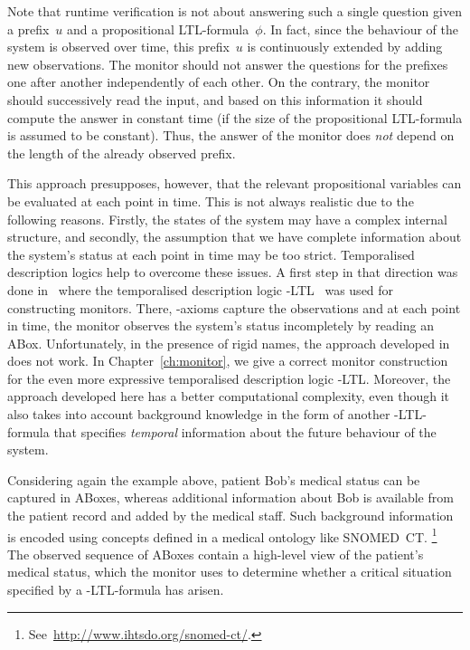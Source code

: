 Note that runtime verification is not about answering such a single question
given a prefix~$u$ and a propositional LTL-formula~$\phi$.  In fact, since the
behaviour of the system is observed over time, this prefix~$u$ is continuously
extended by adding new observations.  The monitor should not answer the
questions for the prefixes one after another independently of each other.  On
the contrary, the monitor should successively read the input, and based on this
information it should compute the answer in constant time (if the size of the
propositional LTL-formula is assumed to be constant).  Thus, the answer of the
monitor does \emph{not} depend on the length of the already observed prefix.

This approach presupposes, however, that the relevant propositional variables
can be evaluated at each point in time.  This is not always realistic due to the
following reasons.  Firstly, the states of the system may have a complex
internal structure, and secondly, the assumption that we have complete
information about the system's status at each point in time may be too strict.
%
Temporalised description logics help to overcome these issues.  A first step in
that direction was done in~\cite{BaBL-FroCoS09} where the temporalised
description logic \ALC-LTL~\cite{BaGL-ToCL12} was used for constructing
monitors.  There, \ALC-axioms capture the observations and at each point in
time, the monitor observes the system's status incompletely by reading an ABox.
Unfortunately, in the presence of rigid names, the approach developed
in~\cite{BaBL-FroCoS09} does not work.  In Chapter~\ref{ch:monitor}, we give a
correct monitor construction for the even more expressive temporalised
description logic \SHOQ-LTL\@.  Moreover, the approach developed here has a
better computational complexity, even though it also takes into account
background knowledge in the form of another \SHOQ-LTL-formula that specifies
\emph{temporal} information about the future behaviour of the system.

Considering again the example above, patient Bob's medical status can be
captured in ABoxes, whereas additional information about Bob is available from
the patient record and added by the medical staff.  Such background information
is encoded using concepts defined in a medical ontology like SNOMED~CT.%
\footnote{See~\url{http://www.ihtsdo.org/snomed-ct/}.}
The observed sequence of ABoxes contain a high-level view of the patient's
medical status, which the monitor uses to determine whether a critical situation
specified by a \SHOQ-LTL-formula has arisen.

